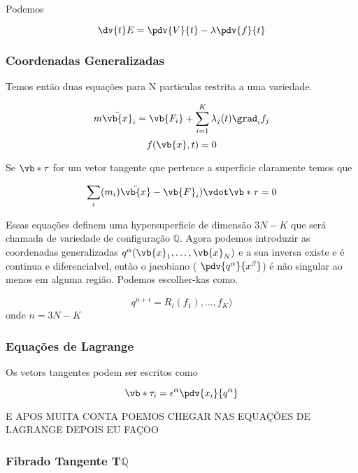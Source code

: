 \documentclass{article}
\begin{document}
Podemos


$$\dv{t}E= \pdv{V}{t}- \lambda \pdv{f}{t}$$



\subsubsection{Coordenadas Generalizadas}

Temos então duas equações para N particulas restrita a uma variedade.

$$m\ddot{\vb{x}}_i= \vb{F_i}+\sum_{i=1}^{K}\lambda_j(t) \grad_i{f_j}$$
$$ f(\vb{x},t)=0$$

Se $\vb*{\tau}$ for um vetor tangente que pertence a superficie claramente temos que


$$ \sum_i(m_i) \ddot{\vb{x}}-\vb{F}_i) \vdot \vb*{\tau}=0$$

Essas equações definem uma hypersuperficie de dimensão $3N-K$ que será chamada de variedade de configuração $\mathbb{Q}$. Agora podemos introduzir as coordenadas generalizadas $q^\alpha ( \vb{x}_1, \dots, \vb{x}_N )$ e a sua inversa existe e é continua e diferencialvel, então o jacobiano ( $\pdv{q^\alpha}{x^\beta}$) é não singular ao menos em alguma região. Podemos escolher-kas como.

$$q^{n+i}=R_i(f_1), \dots, f_K)$$ onde $n=3N-K$


\subsubsection{Equações de Lagrange}


Os vetors tangentes podem ser escritos como


$$ \vb*{\tau}_i= \epsilon^\alpha \pdv{x_i}{q^\alpha}$$


E APOS MUITA CONTA POEMOS CHEGAR NAS EQUAÇÕES DE LAGRANGE DEPOIS EU FAÇOO




\subsubsection{Fibrado Tangente T$\mathbb{Q}$}
\end{document}
